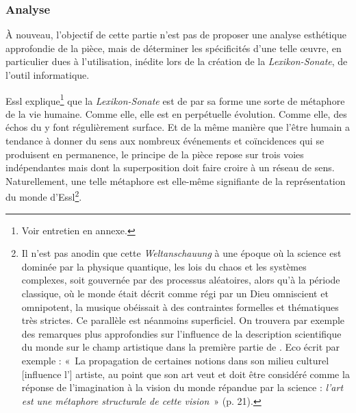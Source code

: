 \documentclass[a4paper,12pt]{article}
\newcommand{\guill}[1]{«~#1~»}
\begin{document}
\subsubsection{Analyse}
\label{lsanalyse}

À nouveau, l'objectif de cette partie n'est pas de proposer une analyse esthétique approfondie de la pièce, mais de déterminer les spécificités d'une telle œuvre, en particulier dues à l'utilisation, inédite lors de la création de la \emph{Lexikon-Sonate}, de l'outil informatique.

Essl explique\footnote{Voir entretien en annexe.} que la \emph{Lexikon-Sonate} est de par sa forme une sorte de métaphore de la vie humaine. Comme elle, elle est en perpétuelle évolution. Comme elle, des échos du y font régulièrement surface. Et de la même manière que l'être humain a tendance à donner du sens aux nombreux événements et coïncidences qui se produisent en permanence, le principe de la pièce repose sur trois voies indépendantes mais dont la superposition doit faire croire à un réseau de sens. Naturellement, une telle métaphore est elle-même signifiante de la représentation du monde d'Essl\footnote{Il n'est pas anodin que cette \emph{Weltanschauung} à une époque où la science est dominée par la physique quantique, les lois du chaos et les systèmes complexes, soit gouvernée par des processus aléatoires, alors qu'à la période classique, où le monde était décrit comme régi par un Dieu omniscient et omnipotent, la musique obéissait à des contraintes formelles et thématiques très strictes. Ce parallèle est néanmoins superficiel. On trouvera par exemple des remarques plus approfondies sur l'influence de la description scientifique du monde sur le champ artistique dans la première partie de \cite{eco1962opera}. Eco écrit par exemple : \guill{La propagation de certaines notions dans son milieu culturel [influence l'] artiste, au point que son art veut et doit être considéré comme la réponse de l'imagination à la vision du monde répandue par la science : \emph{l'art est une métaphore structurale de cette vision}} (p. 21).}.
\end{document}
